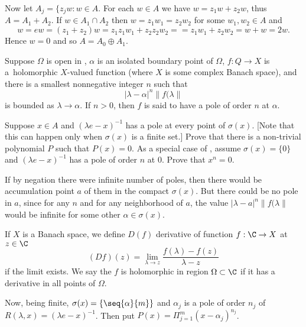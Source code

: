 \begin{enumerate}
Now let \(A_j = \{z_j w: w\in A\).
For each \(w\in A\) we have \(w = z_1 w + z_2 w\), thus \(A = A_1 + A_2\).
If \(w\in A_1 \cap A_2\) then
\(w = z_1 w_1 = z_2 w_2 \) for some \(w_1, w_2 \in A\) and
\begin{equation*}
w = ew = (z_1 + z_2)w
  = z_1z_1w_1 + z_2z_2w_2 =
  = z_1w_1 + z_2w_2 = w + w = 2w.
\end{equation*}
Hence \(w = 0\) and so \(A = A_0 \oplus A_1\).

\begin{excopy}
Suppose \(\Omega\) is open in \C, \(\alpha\) is an isolated boundary point
of \(\Omega\), \(f:Q\to X\) is
a~holomorphic $X$-valued function (where $X$ is some complex Banach space), and
there is a smallest nonnegative integer $n$ such that
\begin{equation*}
|\lambda - \alpha|^n \|f(\lambda\|
\end{equation*}
is bounded as \(\lambda \to \alpha\).
If \(n > 0\), then $f$ is said to have a pole of order $n$ at \(\alpha\).
\begin{itemize}
Suppose \(x \in A\) and \((\lambda e - x)^{-1}\)
has a pole at every point of \(\sigma(x)\). [Note that
this can happen only when \(\sigma(x)\) is a finite set.]
  Prove that there is a non-trivial polynomial $P$ such that \(P(x) = 0\).
As a special case of ,
assume \(\sigma(x) = \{0\}\) and \((\lambda e - x)^{-1}\) has a pole of order
$n$ at $0$. Prove that \(x^n = 0\).
\end{itemize}
\end{excopy}

If by negation there were infinite number of poles,
then there would be accumulation point $a$ of them in the compact \(\sigma(x)\).
But there could be no pole in $a$, since for any $n$
and for any neighborhood of $a$, 
the value \(|\lambda - a|^n \|f(\lambda\|\) would be infinite
for some other \(\alpha \in \sigma(x)\).

If  $X$ is a Banach space,
we define \(D(f)\) derivative of function \(f:\C\to X\) at \(z\in \C\)
\begin{equation*}
(Df)(z) = \lim_{\lambda \to z} \frac{f(\lambda) - f(z)}{\lambda - z}
\end{equation*}
if the limit exists.
We say the $f$ is holomorphic in region \(\Omega \subset \C\)
if it has a derivative in all points of \(\Omega\).

Now, being finite, \(\sigma(x) = \{\seq{\alpha}{m}\}\) and
\(\alpha_j\) is a pole of order \(n_j\) of \(R(\lambda,x)=(\lambda e - x)^{-1}\).
Then put \(P(x) = \Pi_{j=1}^m (x - \alpha_j)^{n_j}\).


\end{enumerate}
